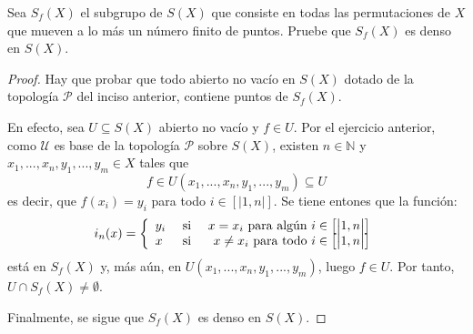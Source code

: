 \documentclass[12pt]{report}
\theoremstyle{largebreak}
\newcommand{\natint}[1]{\ensuremath{\left[\big|#1\big|\right]}}
\begin{document}
    \begin{excer}
        Sea $S_f(X)$ el subgrupo de $S(X)$ que consiste en todas las permutaciones de $X$ que mueven a lo más un número finito de puntos. Pruebe que $S_f(X)$ es denso en $S(X)$.
    \end{excer}

    \begin{proof}
        Hay que probar que todo abierto no vacío en $S(X)$ dotado de la topología $\mathcal{P}$ del inciso anterior, contiene puntos de $S_f(X)$.
        
        En efecto, sea $U\subseteq S(X)$ abierto no vacío y $f\in U$. Por el ejercicio anterior, como $\mathcal{U}$ es base de la topología $\mathcal{P}$ sobre $S(X)$, existen $n\in\mathbb{N}$ y $x_1,...,x_n,y_1,...,y_m\in X$ tales que
        \begin{equation*}
            f\in U(x_1,...,x_n,y_1,...,y_m)\subseteq U
        \end{equation*}
        es decir, que $f(x_i)=y_i$ para todo $i\in\natint{1,n}$. Se tiene entones que la función:
        \begin{equation*}
            i_n(x)=\left\{
                \begin{array}{lcr}
                    y_i & \textup{ si } & x=x_i\textup{ para algún }i\in\natint{1,n} \\
                    x & \textup{ si } & x\neq x_i\textup{ para todo }i\in\natint{1,n}\\
                \end{array}
            \right.
        \end{equation*}
        está en $S_f(X)$ y, más aún, en $U(x_1,...,x_n,y_1,...,y_m)$, luego $f\in U$. Por tanto, $U\cap S_f(X)\neq\emptyset$.

        Finalmente, se sigue que $S_f(X)$ es denso en $S(X)$.

    \end{proof}

    \begin{excer}[Nombre]
        
    \end{excer}
\end{document}
